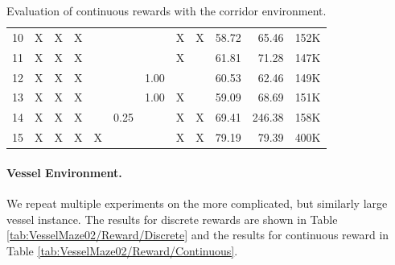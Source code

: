\begin{table}[htp]
\begin{center}
\begin{tabular}{rccccccccrrr}
            10 & X & X & X &  &  &  & X & X & 58.72 & 65.46 & 152K \\
            11 & X & X & X &  &  &  & X &  & 61.81 & 71.28 & 147K \\
            12 & X & X & X &  &  & 1.00 &  &  & 60.53 & 62.46 & 149K \\
            13 & X & X & X &  &  & 1.00 & X &  & 59.09 & 68.69 & 151K \\
            14 & X & X & X &  & 0.25 &  & X & X & 69.41 & 246.38 & 158K \\
            15 & X & X & X & X &  &  & X & X & 79.19 & 79.39 & 400K \\
            \bottomrule
        \end{tabular}
    \end{center}
    \caption[Evaluation of Continuous Reward with the Corridor Environment]{Evaluation of continuous rewards with the corridor environment.} \label{tab:Maze0318/Reward/Continuous}
\end{table}


\paragraph{Vessel Environment.} We repeat multiple experiments on the more complicated, but similarly large vessel instance. The results for discrete rewards are shown in Table \ref{tab:VesselMaze02/Reward/Discrete} and the results for continuous reward in Table \ref{tab:VesselMaze02/Reward/Continuous}. 


